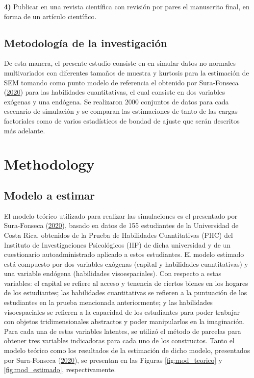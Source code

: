 \documentclass[
  english]{revcoles}
\begin{document}
\textbf{4)} Publicar en una revista científica con revisión por pares el
manuscrito final, en forma de un artículo científico.

\subsection{Metodología de la investigación}

De esta manera, el presente estudio consiste en en simular datos no
normales multivariados con diferentes tamaños de muestra y kurtosis para
la estimación de SEM tomando como punto modelo de referencia el obtenido
por Sura-Fonseca (\protect\hyperlink{ref-SuraFonseca2020}{2020}) para
las habilidades cuantitativas, el cual consiste en dos variables
exógenas y una endógena. Se realizaron 2000 conjuntos de datos para cada
escenario de simulación y se comparan las estimaciones de tanto de las
cargas factoriales como de varios estadísticos de bondad de ajuste que
serán descritos más adelante.

\section{Methodology}

\subsection{Modelo a estimar}

El modelo teórico utilizado para realizar las simulaciones es el
presentado por Sura-Fonseca
(\protect\hyperlink{ref-SuraFonseca2020}{2020}), basado en datos de 155
estudiantes de la Universidad de Costa Rica, obtenidos de la Prueba de
Habilidades Cuantitativas (PHC) del Instituto de Investigaciones
Psicológicos (IIP) de dicha universidad y de un cuestionario
autoadministrado aplicado a estos estudiantes. El modelo estimado está
compuesto por dos variables exógenas (capital y habilidades
cuantitativas) y una variable endógena (habilidades visoespaciales). Con
respecto a estas variables: el capital se refiere al acceso y tenencia
de ciertos bienes en los hogares de los estudiantes; las habilidades
cuantitativas se refieren a la puntuación de los estudiantes en la
prueba mencionada anteriormente; y las habilidades visoespaciales se
refieren a la capacidad de los estudiantes para poder trabajar con
objetos tridimensionales abstractos y poder manipularlos en la
imaginación. Para cada una de estas variables latentes, se utilizó el
método de parcelas para obtener tres variables indicadoras para cada uno
de los constructos. Tanto el modelo teórico como los resultados de la
estimación de dicho modelo, presentados por Sura-Fonseca
(\protect\hyperlink{ref-SuraFonseca2020}{2020}), se presentan en las
Figuras \ref{fig:mod_teorico} y \ref{fig:mod_estimado}, respectivamente.
\end{document}
